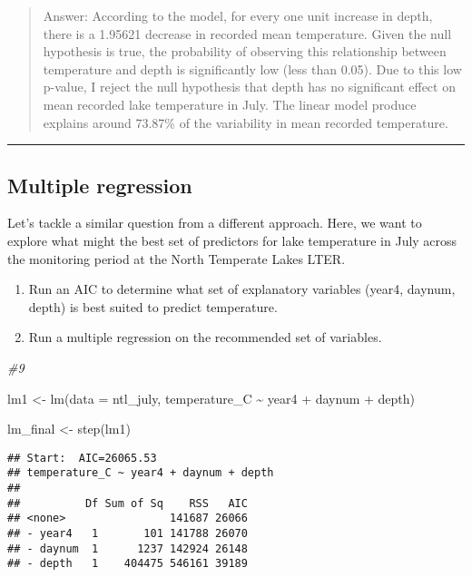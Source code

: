 \documentclass[
]{article}
\newenvironment{Shaded}{\begin{snugshade}}{\end{snugshade}}
\newcommand{\AttributeTok}[1]{\textcolor[rgb]{0.77,0.63,0.00}{#1}}
\newcommand{\CommentTok}[1]{\textcolor[rgb]{0.56,0.35,0.01}{\textit{#1}}}
\newcommand{\FunctionTok}[1]{\textcolor[rgb]{0.00,0.00,0.00}{#1}}
\newcommand{\NormalTok}[1]{#1}
\newcommand{\OtherTok}[1]{\textcolor[rgb]{0.56,0.35,0.01}{#1}}
\newcommand{\SpecialCharTok}[1]{\textcolor[rgb]{0.00,0.00,0.00}{#1}}
\begin{document}
\begin{quote}
Answer: According to the model, for every one unit increase in depth,
there is a 1.95621 decrease in recorded mean temperature. Given the null
hypothesis is true, the probability of observing this relationship
between temperature and depth is significantly low (less than 0.05). Due
to this low p-value, I reject the null hypothesis that depth has no
significant effect on mean recorded lake temperature in July. The linear
model produce explains around 73.87\% of the variability in mean
recorded temperature.
\end{quote}

\begin{center}\rule{0.5\linewidth}{0.5pt}\end{center}

\hypertarget{multiple-regression}{%
\subsection{Multiple regression}\label{multiple-regression}}

Let's tackle a similar question from a different approach. Here, we want
to explore what might the best set of predictors for lake temperature in
July across the monitoring period at the North Temperate Lakes LTER.

\begin{enumerate}
\def\labelenumi{\arabic{enumi}.}
\setcounter{enumi}{8}
\item
  Run an AIC to determine what set of explanatory variables (year4,
  daynum, depth) is best suited to predict temperature.
\item
  Run a multiple regression on the recommended set of variables.
\end{enumerate}

\begin{Shaded}
\begin{Highlighting}[]
\CommentTok{\#9}

\NormalTok{lm1 }\OtherTok{\textless{}{-}} \FunctionTok{lm}\NormalTok{(}\AttributeTok{data =}\NormalTok{ ntl\_july, temperature\_C }\SpecialCharTok{\textasciitilde{}}\NormalTok{ year4 }\SpecialCharTok{+}\NormalTok{ daynum }\SpecialCharTok{+}\NormalTok{ depth)}

\NormalTok{lm\_final }\OtherTok{\textless{}{-}} \FunctionTok{step}\NormalTok{(lm1)}
\end{Highlighting}
\end{Shaded}

\begin{verbatim}
## Start:  AIC=26065.53
## temperature_C ~ year4 + daynum + depth
## 
##          Df Sum of Sq    RSS   AIC
## <none>                141687 26066
## - year4   1       101 141788 26070
## - daynum  1      1237 142924 26148
## - depth   1    404475 546161 39189
\end{verbatim}
\end{document}
